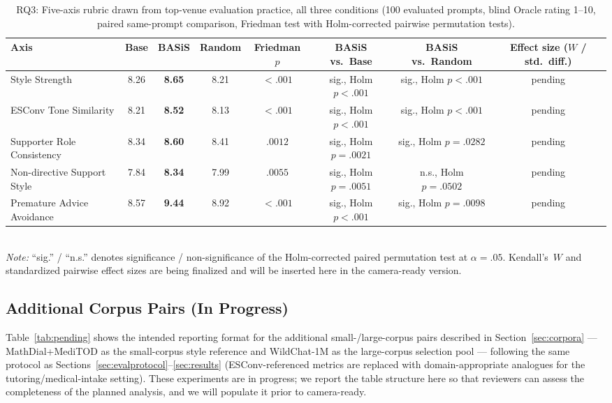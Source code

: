 \documentclass[manuscript,review,anonymous]{acmart}
\begin{document}
\begin{table}[t]
  \caption{RQ3: Five-axis rubric drawn from top-venue evaluation practice, all three conditions (100 evaluated prompts, blind Oracle rating 1--10, paired same-prompt comparison, Friedman test with Holm-corrected pairwise permutation tests).}
  \label{tab:five_axis}
  \footnotesize
  \begin{tabular}{lccccccc}
    \toprule
    Axis & Base & BASiS & Random & Friedman $p$ & BASiS vs.\ Base & BASiS vs.\ Random & Effect size ($W$ / std.\ diff.) \\
    \midrule
    Style Strength               & 8.26 & \textbf{8.65} & 8.21 & $<.001$  & sig., Holm $p<.001$   & sig., Holm $p<.001$   & pending \\
    ESConv Tone Similarity       & 8.21 & \textbf{8.52} & 8.13 & $<.001$  & sig., Holm $p<.001$   & sig., Holm $p<.001$   & pending \\
    Supporter Role Consistency   & 8.34 & \textbf{8.60} & 8.41 & $.0012$  & sig., Holm $p=.0021$  & sig., Holm $p=.0282$  & pending \\
    Non-directive Support Style  & 7.84 & \textbf{8.34} & 7.99 & $.0055$  & sig., Holm $p=.0051$  & n.s., Holm $p=.0502$  & pending \\
    Premature Advice Avoidance   & 8.57 & \textbf{9.44} & 8.92 & $<.001$  & sig., Holm $p<.001$   & sig., Holm $p=.0098$  & pending \\
    \bottomrule
  \end{tabular}
  \\[2pt]
  {\footnotesize \emph{Note:} ``sig.'' / ``n.s.'' denotes significance / non-significance of the Holm-corrected paired permutation test at $\alpha=.05$. Kendall's~$W$ and standardized pairwise effect sizes are being finalized and will be inserted here in the camera-ready version.}
\end{table}

\subsection{Additional Corpus Pairs (In Progress)}
Table~\ref{tab:pending} shows the intended reporting format for the additional small-/large-corpus pairs described in Section~\ref{sec:corpora} --- MathDial+MediTOD as the small-corpus style reference and WildChat-1M as the large-corpus selection pool --- following the same protocol as Sections~\ref{sec:evalprotocol}--\ref{sec:results} (ESConv-referenced metrics are replaced with domain-appropriate analogues for the tutoring/medical-intake setting). These experiments are in progress; we report the table structure here so that reviewers can assess the completeness of the planned analysis, and we will populate it prior to camera-ready.
\end{document}
